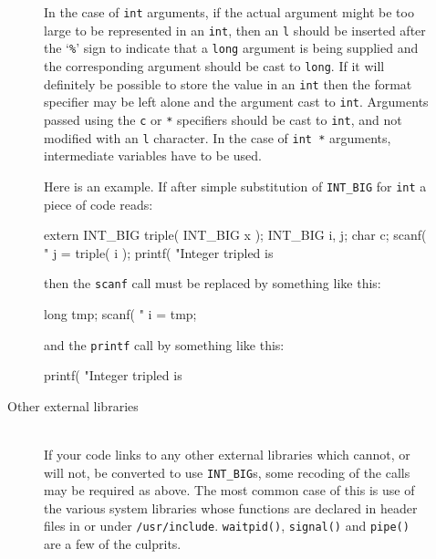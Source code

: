 \documentclass[twoside,11pt,nolof]{starlink}
\providecommand{\file}[1]{\texttt{#1}}
\providecommand{\cc}[1]{\texttt{#1}}
\providecommand{\ditem}[1]{\item[#1]\mbox{}\\}
\newenvironment{squote}{\begin{small}}{\end{small}}
\begin{document}
\begin{description}
\begin{description}
In the case of \cc{int} arguments, if the actual argument
might be too large to be
represented in an \cc{int}, then an \cc{l} should be inserted
after the `{\tt\%}' sign to
indicate that a \cc{long} argument is being supplied and the
corresponding argument should be cast to \cc{long}.  If it will definitely
be possible to store the value in an \cc{int} then the format specifier
may be left alone and the argument cast to \cc{int}.
Arguments passed using the \cc{c} or \cc{*} specifiers should be cast
to \cc{int}, and not modified with an \cc{l} character.
In the case of \cc{int~*} arguments, intermediate variables have to be used.

Here is an example.  If after simple substitution of \cc{INT\_BIG} for
\cc{int} a piece of code reads:
\begin{squote}
\begin{terminalv}
extern INT_BIG triple( INT_BIG x );
INT_BIG i, j;
char c;
scanf( "%
j = triple( i );
printf( "Integer tripled is %
\end{terminalv}
\end{squote}
then the \cc{scanf} call must be replaced by something like this:
\begin{squote}
\begin{terminalv}
{
  long tmp;
  scanf( "%
  i = tmp;
}
\end{terminalv}
\end{squote}
and the \cc{printf} call by something like this:
\begin{squote}
\begin{terminalv}
printf( "Integer tripled is %
\end{terminalv}
\end{squote}

%
\ditem{Other external libraries}
If your code links to any other external libraries
which cannot, or will not, be converted to use \cc{INT\_BIG}s,
some recoding of the calls may be required as above.
The most common case of this is use of the various system libraries
whose functions are declared in header files in or under \file{/usr/include}.
\cc{waitpid()}, \cc{signal()} and \cc{pipe()} are a few of the culprits.
\end{description}
%
\end{description}
\end{document}
